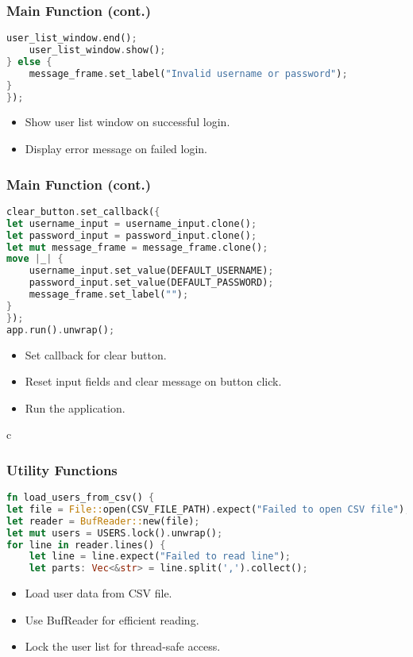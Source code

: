 \documentclass[aspectratio=169, table]{beamer}
\begin{document}
\begin{frame}[fragile]
\frametitle{Main Function (cont.)}
\begin{lstlisting}[language=Rust]
	user_list_window.end();
	user_list_window.show();
} else {
	message_frame.set_label("Invalid username or password");
}
});
\end{lstlisting}
\begin{itemize}
\item Show user list window on successful login.
\item Display error message on failed login.
\end{itemize}
\end{frame}

\begin{frame}[fragile]
\frametitle{Main Function (cont.)}
\vspace{15pt}
\begin{lstlisting}[language=Rust]
clear_button.set_callback({
let username_input = username_input.clone();
let password_input = password_input.clone();
let mut message_frame = message_frame.clone();
move |_| {
	username_input.set_value(DEFAULT_USERNAME);
	password_input.set_value(DEFAULT_PASSWORD);
	message_frame.set_label("");
}
});
app.run().unwrap();
\end{lstlisting}
\begin{itemize}
\item Set callback for clear button.
\item Reset input fields and clear message on button click.
\item Run the application.
\end{itemize}
\end{frame}

c
\begin{frame}[fragile]
\frametitle{Utility Functions}
\begin{lstlisting}[language=Rust]
fn load_users_from_csv() {
let file = File::open(CSV_FILE_PATH).expect("Failed to open CSV file");
let reader = BufReader::new(file);
let mut users = USERS.lock().unwrap();
for line in reader.lines() {
	let line = line.expect("Failed to read line");
	let parts: Vec<&str> = line.split(',').collect();
\end{lstlisting}
\begin{itemize}
	\item Load user data from CSV file.
	\item Use BufReader for efficient reading.
	\item Lock the user list for thread-safe access.
\end{itemize}
\end{frame}
\end{document}
